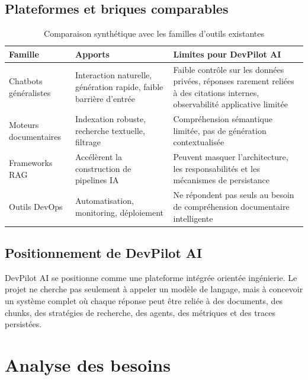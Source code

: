 \documentclass[12pt,a4paper,oneside]{report}
\begin{document}
\section{Plateformes et briques comparables}
\begin{table}[H]
  \centering
  \caption{Comparaison synthétique avec les familles d'outils existantes}
  \begin{tabularx}{\textwidth}{L{3.2cm}Y Y}
    \toprule
    \textbf{Famille} & \textbf{Apports} & \textbf{Limites pour DevPilot AI} \\
    \midrule
    Chatbots généralistes & Interaction naturelle, génération rapide, faible barrière d'entrée & Faible contrôle sur les données privées, réponses rarement reliées à des citations internes, observabilité applicative limitée \\
    Moteurs documentaires & Indexation robuste, recherche textuelle, filtrage & Compréhension sémantique limitée, pas de génération contextualisée \\
    Frameworks RAG & Accélèrent la construction de pipelines IA & Peuvent masquer l'architecture, les responsabilités et les mécanismes de persistance \\
    Outils DevOps & Automatisation, monitoring, déploiement & Ne répondent pas seuls au besoin de compréhension documentaire intelligente \\
    \bottomrule
  \end{tabularx}
\end{table}

\section{Positionnement de DevPilot AI}
DevPilot AI se positionne comme une plateforme intégrée orientée ingénierie. Le projet ne cherche pas seulement à appeler un modèle de langage, mais à concevoir un système complet où chaque réponse peut être reliée à des documents, des chunks, des stratégies de recherche, des agents, des métriques et des traces persistées.

\chapter{Analyse des besoins}
\end{document}
